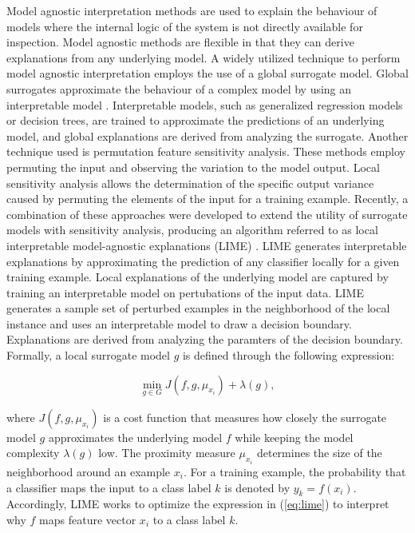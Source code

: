 Model agnostic interpretation methods are used to explain the behaviour of models where the internal logic of the system is not directly available for inspection. Model agnostic methods are flexible in that they can derive explanations from any underlying model. A widely utilized technique to perform model agnostic interpretation employs the use of a global surrogate model. Global surrogates approximate the behaviour of a complex model by using an interpretable model \cite{craven1996extracting}. Interpretable models, such as generalized regression models or decision trees, are trained to approximate the predictions of an underlying model, and global explanations are derived from analyzing the surrogate. Another technique used is permutation feature sensitivity analysis. These methods employ permuting the input and observing the variation to the model output. Local sensitivity analysis allows the determination of the specific output variance caused by permuting the elements of the input for a training example. Recently, a combination of these approaches were developed to extend the utility of surrogate models with sensitivity analysis, producing an algorithm referred to as local interpretable model-agnostic explanations (LIME) \cite{ribeiro2016should}. LIME generates interpretable explanations by approximating the prediction of any classifier locally for a given training example. Local explanations of the underlying model are captured by training an interpretable model on pertubations of the input data. LIME generates a sample set of perturbed examples in the neighborhood of the local instance and uses an interpretable model to draw a decision boundary. Explanations are derived from analyzing the paramters of the decision boundary. Formally, a local surrogate model $g$ is defined through the following expression:

\begin{equation}
    \min_{g \in G} J(f,g,\mu_{x_i}) + \lambda(g),
    \label{eq:lime}
\end{equation}

\noindent
where $J(f,g,\mu_{x_i})$ is a cost function that measures how closely the surrogate model $g$ approximates the underlying model $f$ while keeping the model complexity $\lambda(g)$ low. The proximity measure $\mu_{x_i}$ determines the size of the neighborhood around an example $x_i$. For a training example, the probability that a classifier maps the input to a class label $k$ is denoted by $y_{k} = f(x_i)$. Accordingly, LIME works to optimize the expression in (\ref{eq:lime}) to interpret why $f$ maps feature vector $x_i$ to a class label $k$.

